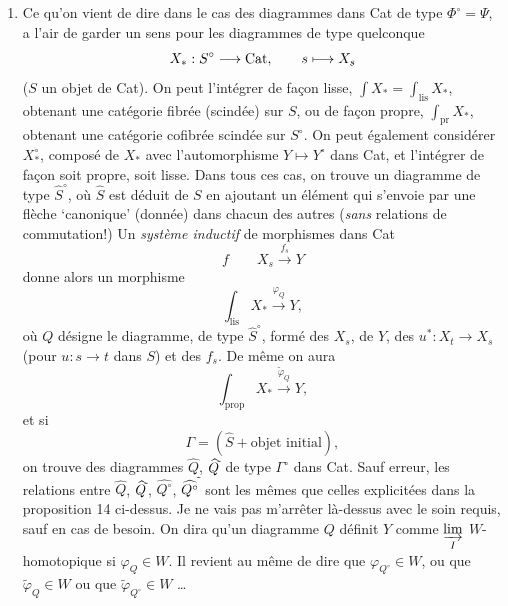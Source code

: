\begin{enumerate}
\item[1)] Ce qu'on vient de dire dans le cas des diagrammes dans Cat de type $\Phi^\circ = \Psi$, a l'air de garder un sens pour les diagrammes de type quelconque
\[
X_* : S^\circ \longrightarrow \mathrm{Cat}, \qquad s \longmapsto X_s
\]
($S$ un objet de Cat). On peut l'intégrer de façon lisse, $\int X_* = \int_{\mathrm{lis}} X_*$, obtenant une catégorie fibrée (scindée) sur $S$, ou de façon propre, $\int_{\mathrm{pr}} X_*$, obtenant une catégorie cofibrée scindée sur $S^\circ$. On peut également considérer $X_*^\circ$, composé de $X_*$ avec l'automorphisme $Y \longmapsto Y^\circ$ dans Cat, et l'intégrer de façon soit propre, soit lisse. Dans tous ces cas, on trouve un diagramme de type $\widehat{S}^\circ$, où $\widehat{S}$ est déduit de $S$ en ajoutant un élément qui s'envoie par une flèche ‘canonique’ (donnée) dans chacun des autres (\textit{sans} relations de commutation!) Un
\textit{système inductif} de morphismes dans Cat
\[
f \qquad X_s \xrightarrow{f_s} Y
\]
donne alors un morphisme
\[
\int_{\mathrm{lis}} X_* \xrightarrow{\varphi_Q} Y,
\]
où $Q$ désigne le diagramme, de type $\widehat{S}^\circ$, formé des $X_s$, de $Y$, des $u^* : X_t \longrightarrow X_s$ (pour $u : s \longrightarrow t$ dans $S$) et des $f_s$. De même on aura
\[
\int_{\mathrm{prop}} X_* \xrightarrow{\tilde{\varphi}_Q} Y,
\]
et si
\[
\Gamma = (\widehat{S} + \text{objet initial}),
\]
on trouve des diagrammes $\widehat{Q}$, $\widehat{Q}^{\tilde{}}$ de type $\Gamma^\circ$ dans Cat. Sauf erreur, les relations entre $\widehat{Q}$, $\widehat{Q}^{\tilde{}}$, $\widehat{Q^\circ}$, $\widehat{Q^\circ}^{\tilde{}}$ sont les mêmes que celles explicitées dans la proposition 14 ci-dessus. Je ne vais pas m'arrêter là-dessus avec le soin requis, sauf en cas de besoin. On dira qu'un diagramme $Q$ définit $Y$ comme $\varinjlim\limits_{I}$ $W$-homotopique si $\varphi_Q \in W$. Il revient au même de dire que $\varphi_{Q^\circ} \in W$, ou que $\tilde{\varphi}_Q \in W$ ou que $\tilde{\varphi}_{Q^\circ} \in W$ \dots
{}


\end{enumerate}
